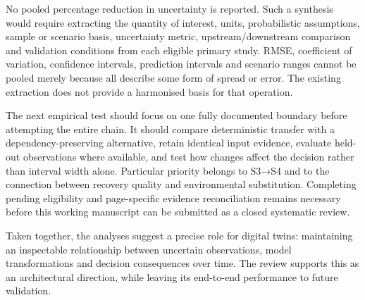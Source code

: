 No pooled percentage reduction in uncertainty is reported. Such a synthesis would require extracting the quantity of interest, units, probabilistic assumptions, sample or scenario basis, uncertainty metric, upstream/downstream comparison and validation conditions from each eligible primary study. RMSE, coefficient of variation, confidence intervals, prediction intervals and scenario ranges cannot be pooled merely because all describe some form of spread or error. The existing extraction does not provide a harmonised basis for that operation.

The next empirical test should focus on one fully documented boundary before attempting the entire chain. It should compare deterministic transfer with a dependency-preserving alternative, retain identical input evidence, evaluate held-out observations where available, and test how changes affect the decision rather than interval width alone. Particular priority belongs to S3→S4 and to the connection between recovery quality and environmental substitution. Completing pending eligibility and page-specific evidence reconciliation remains necessary before this working manuscript can be submitted as a closed systematic review.

Taken together, the analyses suggest a precise role for digital twins: maintaining an inspectable relationship between uncertain observations, model transformations and decision consequences over time. The review supports this as an architectural direction, while leaving its end-to-end performance to future validation.
